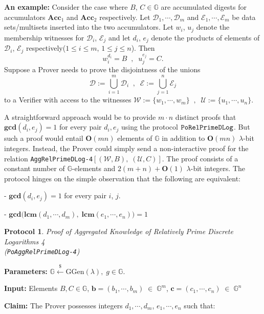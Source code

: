 \documentclass[11pt, lettersize, notitlepage, leqno, footskip=0.6cm]{article}
\newcommand{\bG}{\mathbb{G}}
\newcommand{\Acc}{\mbf{Acc}}
\newcommand{\mc}{\mathcal}
\newcommand{\mb}{\mathbb}
\newcommand{\mbf}{\mathbf}
\newcommand{\mr}{\mathrm}
\newcommand{\lamb}{\lambda}
\newcommand{\bO}{\mbf{O}}
\newcommand{\vs}{\vspace{-0.15cm}}
\newcommand{\noin}{\noindent}
\newcommand{\LCM}{\mbf{lcm}}
\newcommand{\GCD}{\mbf{gcd}}
\newtheorem{Prot}[Thm]{Protocol}
\numberwithin{equation}{section}
\begin{document}
\noindent \textbf{An example:} Consider the case where $B$, $C\in\bG$ are accumulated digests for accumulators $\Acc_1$ and $\Acc_2$ respectively. Let $\mc{D}_1,\cdots,\mc{D}_m$ and $\mc{E}_1,\cdots,\mc{E}_m$ be data sets/multisets inserted into the two accumulators. Let $w_i$, $u_j$ denote the membership witnesses for $\mc{D}_i$, $\mc{E}_j$ and let $d_i$, $e_j$ denote the products of elements of $\mc{D}_i$, $\mc{E}_j$ respectively($1\leq i\leq m$, $1\leq j\leq n$). Then $$w_i^{d_i} = B\;\;,\;\; u_j^{e_j} = C.$$ Suppose a Prover needs to prove the disjointness of the unions \vs $$\mc{D} := \bigcup\limits_{i=1}^m \mc{D}_i\;\;,\;\;\mc{E} := \bigcup\limits_{j=1}^n \mc{E}_j$$ to a Verifier with access to the witnesses $\mc{W}:= \{w_1,\cdots,w_m \}\;\;,\;\;\mc{U}:= \{u_1,\cdots,u_n \}.$

A straightforward approach would be to provide $m\cdot n$ distinct proofs that $\GCD(d_i, e_j) = 1$ for every pair $d_i,e_j$ using the protocol $\tt{PoRelPrimeDLog}$. But such a proof would entail $\mbf{O}(mn)$ elements of $\mb{G}$ in addition to $\mbf{O}(mn)$ $\lamb$-bit integers. Instead, the Prover could simply send a non-interactive proof for the relation \verb|AggRelPrimeDLog-4|$[(\mc{W}, B),\;(\mc{U}, C)]$. The proof consists of a constant number of $\mb{G}$-elements and $2(m+n)+\bO(1)$ $\lamb$-bit integers. The protocol hinges on the simple observation that the following are equivalent: \vspace{0.1cm}

\noin - $\GCD(d_i,e_j) = 1$ for every pair $i$, $j$.

\noin - $\GCD\big(\LCM(d_1,\cdots,d_m),\; \LCM(e_1,\cdots, e_n)\big) = 1$

\vspace{0.2cm} 


\begin{Prot} \normalfont \hypertarget{RP4}{\textit{Proof of Aggregated Knowledge of Relatively Prime Discrete Logarithms} 4}\\ (\verb|PoAggRelPrimeDLog-4|)\end{Prot}\vspace{-0.3cm}

\noindent \textbf{Parameters:} $\mb{G}\xleftarrow{\$} \mr{GGen}(\lamb), \; g\in \mb{G}$.

\noindent \textbf{Input:} Elements $B, C\in \mb{G}$,\;  $\mbf{b} = (b_1,\cdots, b_m)\;\in\;\mb{G}^m$,\;\; $\mbf{c} = (c_1,\cdots, c_n)\;\in\;\mb{G}^n$

\noindent \textbf{Claim:} The Prover possesses integers $ d_1,\cdots, d_m$,\; $e_1,\cdots,e_n$ such that:
\end{document}
